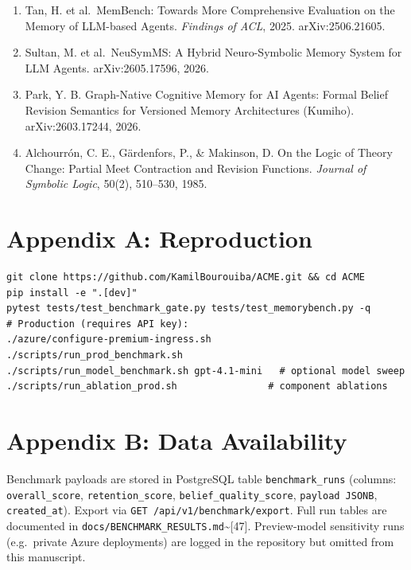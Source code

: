 \documentclass[11pt,a4paper]{article}
\begin{document}
\begin{enumerate}
  Hu, Y. et al.~Evaluating Memory in LLM Agents via Incremental
  Multi-Turn Interactions. arXiv:2507.05257, 2025.
\item
  Tan, H. et al.~MemBench: Towards More Comprehensive Evaluation on the
  Memory of LLM-based Agents. \emph{Findings of ACL}, 2025.
  arXiv:2506.21605.
\item
  Sultan, M. et al.~NeuSymMS: A Hybrid Neuro-Symbolic Memory System for
  LLM Agents. arXiv:2605.17596, 2026.
\item
  Park, Y. B. Graph-Native Cognitive Memory for AI Agents: Formal Belief
  Revision Semantics for Versioned Memory Architectures (Kumiho).
  arXiv:2603.17244, 2026.
\item
  Alchourrón, C. E., Gärdenfors, P., \& Makinson, D. On the Logic of
  Theory Change: Partial Meet Contraction and Revision Functions.
  \emph{Journal of Symbolic Logic}, 50(2), 510--530, 1985.
\end{enumerate}

\acmeReferencesEnd

\begingroup\footnotesize

\section{Appendix A: Reproduction}
\label{appendix-a-reproduction}

\begin{tcolorbox}[
  enhanced,
  colback=bannerbg,
  colframe=keyborder!25,
  boxrule=0.35pt,
  arc=3pt,
  left=8pt, right=8pt, top=6pt, bottom=6pt
]
\begin{Verbatim}[fontsize=\scriptsize]
git clone https://github.com/KamilBourouiba/ACME.git && cd ACME
pip install -e ".[dev]"
pytest tests/test_benchmark_gate.py tests/test_memorybench.py -q
# Production (requires API key):
./azure/configure-premium-ingress.sh
./scripts/run_prod_benchmark.sh
./scripts/run_model_benchmark.sh gpt-4.1-mini   # optional model sweep
./scripts/run_ablation_prod.sh                # component ablations
\end{Verbatim}
\end{tcolorbox}

\section{Appendix B: Data Availability}
\label{appendix-b-data-availability}

Benchmark payloads are stored in PostgreSQL table
\texttt{benchmark\_runs} (columns: \texttt{overall\_score},
\texttt{retention\_score}, \texttt{belief\_quality\_score},
\texttt{payload JSONB}, \texttt{created\_at}). Export via
\texttt{GET /api/v1/benchmark/export}. Full run tables are documented in
\texttt{docs/BENCHMARK\_RESULTS.md}\textasciitilde{[}47{]}.
Preview-model sensitivity runs (e.g.~private Azure deployments) are
logged in the repository but omitted from this manuscript.

\endgroup
\end{document}
